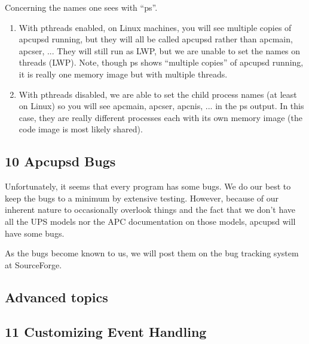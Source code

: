 \begin{description}
Concerning the names one sees with ``ps''.  

\begin{enumerate}
\item With pthreads enabled, on Linux machines, you will see multiple copies
of apcupsd running, but they will all be called apcupsd rather than apcmain,
apcser, ... They will still run as LWP, but we are unable to set the names on
threads (LWP). Note, though ps shows ``multiple copies'' of apcupsd running,
it is really one memory image but with multiple threads.  
\item With pthreads disabled, we are able to set the child process names (at
least on Linux) so you will see apcmain, apcser, apcnis, ... in the ps output.
In this case, they are really different processes each with its own memory
image (the code image is most likely shared).  
\end{enumerate}

\end{description}

\label{Apcupsd-Bugs}

\subsection*{10 Apcupsd Bugs}

\label{index-Bugs-148}
Unfortunately, it seems that every program has some bugs. We do our best to
keep the bugs to a minimum by extensive testing. However, because of our
inherent nature to occasionally overlook things and the fact that we don't
have all the UPS models nor the APC documentation on those models, apcupsd
will have some bugs.  

As the bugs become known to us, we will post them on the bug tracking system
at SourceForge. 

\label{Advanced-topics}

\subsection*{Advanced topics}

\label{index-Advanced-149}

\label{Customizing-Event-Handling}

\subsection*{11 Customizing Event Handling}

